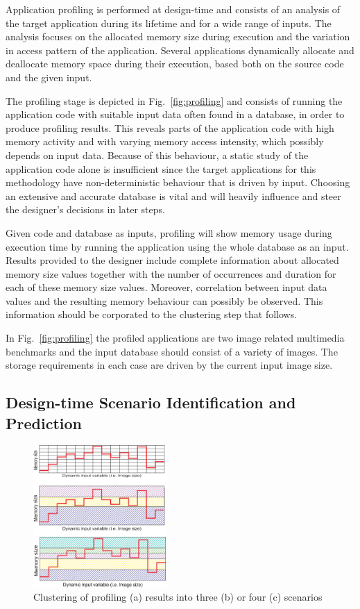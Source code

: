 \documentclass[a4paper,conference]{IEEEtran}
\begin{document}
Application profiling is performed at design-time and consists of an analysis of the target application during its lifetime and for a wide range of inputs. The analysis focuses on the allocated memory size during execution and the variation in access pattern of the application. Several applications dynamically allocate and deallocate memory space during their execution, based both on the source code and the given input. 

The profiling stage is depicted in Fig.~\ref{fig:profiling} and consists of running the application code with suitable input data often found in a database, in order to produce profiling results. This reveals parts of the application code with high memory activity and with varying memory access intensity, which possibly depends on input data. Because of this behaviour, a static study of the application code alone is insufficient since the target applications for this methodology have non-deterministic behaviour that is driven by input. Choosing an extensive and accurate database is vital and will heavily influence and steer the designer's decisions in later steps. 

Given code and database as inputs, profiling will show memory usage during execution time by running the application using the whole database as an input. Results provided to the designer include complete information about allocated memory size values together with the number of occurrences and duration for each of these memory size values. Moreover, correlation between input data values and the resulting memory behaviour can possibly be observed. This information should be corporated to the clustering step that follows. 

In Fig.~\ref{fig:profiling} the profiled applications are two image related multimedia benchmarks and the input database should consist of a variety of images. The storage requirements in each case are driven by the current input image size. 

\subsection{Design-time Scenario Identification and Prediction}

\begin{figure}[!t]
\centering
\includegraphics[width=0.45\textwidth]{Images/1Dclustering.eps}
\caption{Clustering of profiling (a) results into three (b) or four (c) scenarios}
\label{fig:clustering}
\end{figure}
\end{document}
